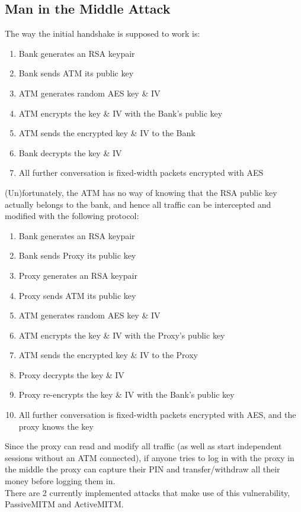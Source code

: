 \documentclass[12pt]{article}
\begin{document}
\subsection*{Man in the Middle Attack}
The way the initial handshake is supposed to work is:
\begin{enumerate}[1)]
\item Bank generates an RSA keypair
\item Bank sends ATM its public key
\item ATM generates random AES key \& IV
\item ATM encrypts the key \& IV with the Bank's public key
\item ATM sends the encrypted key \& IV to the Bank
\item Bank decrypts the key \& IV
\item All further conversation is fixed-width packets encrypted with AES
\end{enumerate}
(Un)fortunately, the ATM has no way of knowing that the RSA public key actually belongs to the bank, and hence all traffic can be intercepted and modified with the following protocol:
\begin{enumerate}[1)]
\item Bank generates an RSA keypair
\item Bank sends Proxy its public key
\item Proxy generates an RSA keypair
\item Proxy sends ATM its public key
\item ATM generates random AES key \& IV
\item ATM encrypts the key \& IV with the Proxy's public key
\item ATM sends the encrypted key \& IV to the Proxy
\item Proxy decrypts the key \& IV
\item Proxy re-encrypts the key \& IV with the Bank's public key
\item All further conversation is fixed-width packets encrypted with AES, and the proxy knows the key
\end{enumerate}
Since the proxy can read and modify all traffic (as well as start independent sessions without an ATM connected), if anyone tries to log in with the proxy in the middle the proxy can capture their PIN and transfer/withdraw all their money before logging them in.
\\
There are 2 currently implemented attacks that make use of this vulnerability, PassiveMITM and ActiveMITM.
\end{document}
